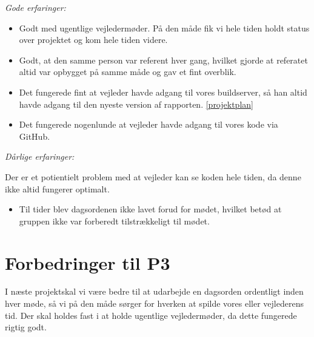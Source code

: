 \emph{Gode erfaringer:}
\begin{itemize}

\item Godt med ugentlige vejledermøder. På den måde fik vi hele tiden holdt status over projektet og kom hele tiden videre.

\item Godt, at den samme person var referent hver gang, hvilket gjorde at referatet altid var opbygget på samme måde og gav et fint overblik.

\item Det fungerede fint at vejleder havde adgang til vores buildserver, så han altid havde adgang til den nyeste version af rapporten. \ref{projektplan}

\item Det fungerede nogenlunde at vejleder havde adgang til vores kode via GitHub.

\end{itemize}
\emph{Dårlige erfaringer:}

\item Der er et potientielt problem med at vejleder kan se koden hele tiden, da denne ikke altid fungerer optimalt.

\begin{itemize}
\item	Til tider blev dagsordenen ikke lavet forud for mødet, hvilket betød at gruppen ikke var forberedt tilstrækkeligt til mødet.

\end{itemize}

\section{Forbedringer til P3}

I næste projektskal vi være bedre til at udarbejde en dagsorden ordentligt inden hver møde, så vi på den måde sørger for hverken at spilde vores eller vejlederens tid. Der skal holdes fast i at holde ugentlige vejledermøder, da dette fungerede rigtig godt. 
